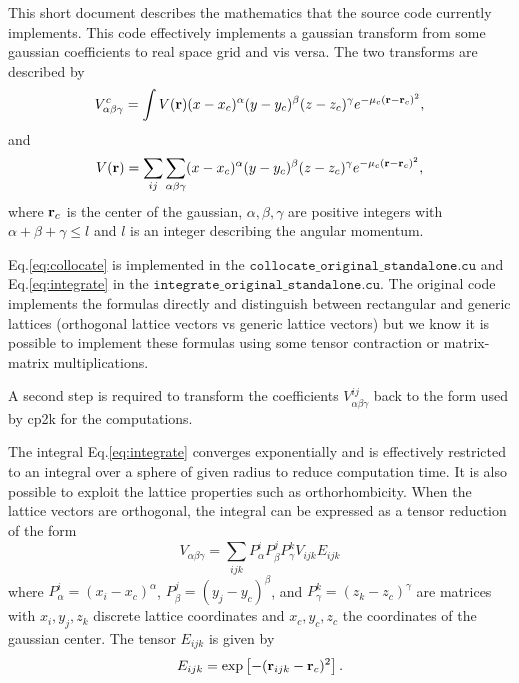 \documentclass{article}
\begin{document}
This short document describes the mathematics that the source code currently
implements. This code effectively implements a gaussian transform from some
gaussian coefficients to real space grid and vis versa. The two transforms are
described by
\begin{equation}
\label{eq:integrate}
V^{c}_{\alpha\beta\gamma} = \int V({\bf r}) (x - x_{c})^\alpha(y - y_{c})^\beta(z - z_{c})^\gamma e^{-\mu_{c} ({\bf r} - {\bf r}_{c})^2},
\end{equation}
and
\begin{equation}
\label{eq:collocate}
V({\bf r}) = \sum_{ij} \sum_{\alpha\beta\gamma} (x - x_{c})^\alpha(y - y_{c})^\beta(z - z_{c})^\gamma e^{-\mu_{c} ({\bf r} - {\bf r}_{c})^2},
\end{equation}
where ${\bf r}_{c}$ is the center of the gaussian, $\alpha,\beta,\gamma$ are
positive integers with $\alpha+\beta+\gamma \leq l$ and $l$ is an integer
describing the angular momentum.

Eq.\ref{eq:collocate} is implemented in the
$\mathtt{collocate\_original\_standalone.cu}$ and Eq.\ref{eq:integrate} in the
$\mathtt{integrate\_original\_standalone.cu}$. The original code implements the
formulas directly and distinguish between rectangular and generic lattices
(orthogonal lattice vectors vs generic lattice vectors) but we know it is
possible to implement these formulas using some tensor contraction or
matrix-matrix multiplications.

A second step is required to transform the coefficients
$V^{ij}_{\alpha\beta\gamma}$ back to the form used by cp2k for the computations.

The integral Eq.\ref{eq:integrate} converges exponentially and is effectively
restricted to an integral over a sphere of given radius to reduce computation
time. It is also possible to exploit the lattice properties such as
orthorhombicity. When the lattice vectors are orthogonal, the integral can be
expressed as a tensor reduction of the form
\begin{equation}
  \label{decomposition::tensor}
  V_{\alpha\beta\gamma} = \sum_{ijk} P^{i}_{\alpha} P^{j}_{\beta} P^{k}_{\gamma} V_{ijk} E_{ijk}
\end{equation}
where $P^{i}_{\alpha} = (x_i - x_c)^\alpha$, $P^{j}_{\beta} = (y_j -
y_c)^\beta$, and $P^{k}_{\gamma} = (z_k - z_c)^\gamma$ are matrices with
$x_i,y_j,z_k$ discrete lattice coordinates and $x_c,y_c, z_c$ the
coordinates of the gaussian center. The tensor $E_{ijk}$ is given by
$$E_{ijk} = \exp\left[ - ({\bf r}_{ijk} - {\bf r}_c)^2\right].$$
\end{document}
